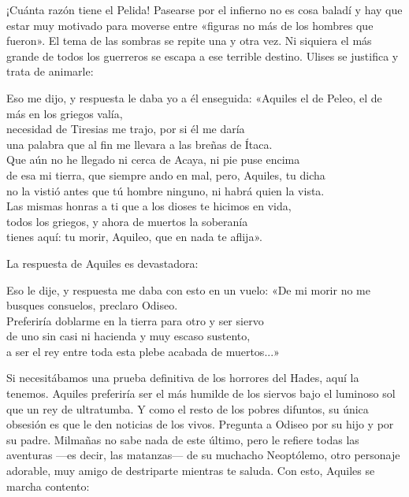 ¡Cuánta razón tiene el Pelida! Pasearse por el infierno no es cosa baladí y hay que estar muy motivado para moverse entre «figuras no más de los hombres que fueron». El tema de las sombras se repite una y otra vez. Ni siquiera el más grande de todos los guerreros se escapa a ese terrible destino. Ulises se justifica y trata de animarle:


\begin{versocita}
Eso me dijo, y respuesta le daba yo a él enseguida:
\stanzabreak
«Aquiles el de Peleo, el de más en los griegos valía,\\
necesidad de Tiresias me trajo, por si él me daría\\
una palabra que al fin me llevara a las breñas de Ítaca.\\
Que aún no he llegado ni cerca de Acaya, ni pie puse encima\\
de esa mi tierra, que siempre ando en mal, pero, Aquiles, tu dicha\\
no la vistió antes que tú hombre ninguno, ni habrá quien la vista.\\
Las mismas honras a ti que a los dioses te hicimos en vida,\\
todos los griegos, y ahora de muertos la soberanía\\
tienes aquí: tu morir, Aquileo, que en nada te aflija».
\end{versocita}

La respuesta de Aquiles es devastadora:

\begin{versocita}
Eso le dije, y respuesta me daba con esto en un vuelo:
\stanzabreak
«De mi morir no me busques consuelos, preclaro Odiseo.\\
Preferiría doblarme en la tierra para otro y ser siervo\\
de uno sin casi ni hacienda y muy escaso sustento,\\
a ser el rey entre toda esta plebe acabada de muertos...»
\end{versocita}

Si necesitábamos una prueba definitiva de los horrores del Hades, aquí la tenemos. Aquiles preferiría ser el más humilde de los siervos bajo el luminoso sol que un rey de ultratumba. Y como el resto de los pobres difuntos, su única obsesión es que le den noticias de los vivos. Pregunta a Odiseo por su hijo y por su padre. Milmañas no sabe nada de este último, pero le refiere todas las aventuras ---es decir, las matanzas--- de su muchacho Neoptólemo, otro personaje adorable, muy amigo de destriparte mientras te saluda. Con esto, Aquiles se marcha contento:


